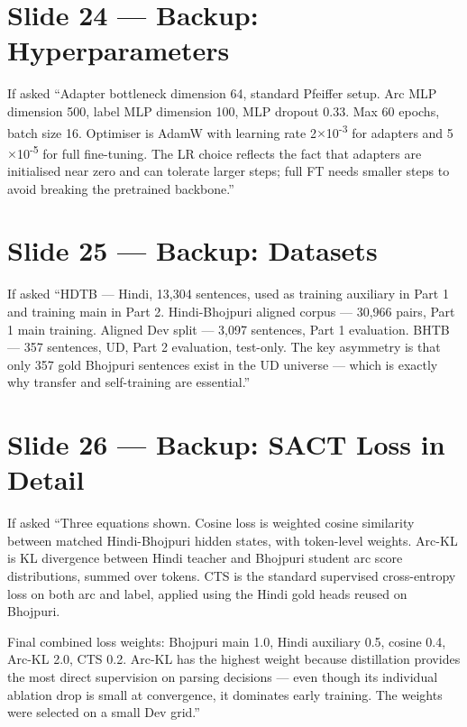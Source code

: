 \documentclass[11pt]{article}
\begin{document}
\section{Slide 24 --- Backup: Hyperparameters}

\begin{pitchbox}{If asked}
``Adapter bottleneck dimension 64, standard Pfeiffer setup. Arc MLP dimension 500, label MLP dimension 100, MLP dropout 0.33. Max 60 epochs, batch size 16. Optimiser is AdamW with learning rate 2$\times$10\textsuperscript{-3} for adapters and 5$\times$10\textsuperscript{-5} for full fine-tuning. The LR choice reflects the fact that adapters are initialised near zero and can tolerate larger steps; full FT needs smaller steps to avoid breaking the pretrained backbone.''
\end{pitchbox}

\section{Slide 25 --- Backup: Datasets}

\begin{pitchbox}{If asked}
``HDTB --- Hindi, 13,304 sentences, used as training auxiliary in Part 1 and training main in Part 2. Hindi-Bhojpuri aligned corpus --- 30,966 pairs, Part 1 main training. Aligned Dev split --- 3,097 sentences, Part 1 evaluation. BHTB --- 357 sentences, UD, Part 2 evaluation, test-only. The key asymmetry is that only 357 gold Bhojpuri sentences exist in the UD universe --- which is exactly why transfer and self-training are essential.''
\end{pitchbox}

\section{Slide 26 --- Backup: SACT Loss in Detail}

\begin{pitchbox}{If asked}
``Three equations shown. Cosine loss is weighted cosine similarity between matched Hindi-Bhojpuri hidden states, with token-level weights. Arc-KL is KL divergence between Hindi teacher and Bhojpuri student arc score distributions, summed over tokens. CTS is the standard supervised cross-entropy loss on both arc and label, applied using the Hindi gold heads reused on Bhojpuri.

Final combined loss weights: Bhojpuri main 1.0, Hindi auxiliary 0.5, cosine 0.4, Arc-KL 2.0, CTS 0.2. Arc-KL has the highest weight because distillation provides the most direct supervision on parsing decisions --- even though its individual ablation drop is small at convergence, it dominates early training. The weights were selected on a small Dev grid.''
\end{pitchbox}
\end{document}
